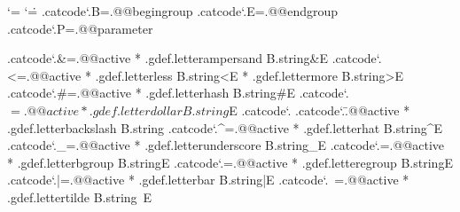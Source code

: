 \iffalse %

\edef\@@XML            {*}
\edef\@@XMLentity      {\@@XML a} %
\edef\@@XMLelement     {\@@XML b} %
\edef\@@XMLvariable    {\@@XML c} %
\edef\@@XMLvalue       {\@@XML d} %
\edef\@@XMLpars        {\@@XML e} %
\edef\@@XMLdata        {\@@XML f} %
\edef\@@XMLcode        {\@@XML g} %
\edef\@@XMLinstruction {\@@XML h} %
\edef\@@XMLmap         {\@@XML i} %
\edef\@@XMLlist        {\@@XML j} %
\edef\@@XMLnamespace   {\@@XML k} %
\edef\@@XMLurlspace    {\@@XML l} %
\edef\@@XMLescape      {\@@XML m} %
\edef\@@XMLdepth       {\@@XML n} %
\edef\@@XMLdopth       {\@@XML o} %
\edef\@@XMLsave        {\@@XML p} %

\fi

\newtoks\XMLtoks
\newtoks\XMLresetlist

\newif\ifignoreXMLspaces
\newif\iffixedXMLfont
\newif\iftraceXMLelements

\newcount\XMLlevel %
\newcount\XMLdepth %

\newtoks\everyenableXML



\chardef\XMLtokensreduction\zerocount


\bgroup
\catcode`\*=\@@comment
\catcode`\.=\@@escape
.catcode`.B=.@@begingroup
.catcode`.E=.@@endgroup
.catcode`.P=.@@parameter

.catcode`.&=.@@active * .gdef.letterampersand  B.string&E
.catcode`.<=.@@active * .gdef.letterless       B.string<E
                      * .gdef.lettermore       B.string>E
.catcode`.#=.@@active * .gdef.letterhash       B.string#E
.catcode`.$=.@@active * .gdef.letterdollar     B.string$E
.catcode`.%
.catcode`.\=.@@active * .gdef.letterbackslash  B.string\E
.catcode`.^=.@@active * .gdef.letterhat        B.string^E
.catcode`._=.@@active * .gdef.letterunderscore B.string_E
.catcode`.{=.@@active * .gdef.letterbgroup     B.string{E
.catcode`.}=.@@active * .gdef.letteregroup     B.string}E
.catcode`.|=.@@active * .gdef.letterbar        B.string|E
.catcode`.~=.@@active * .gdef.lettertilde      B.string~E

